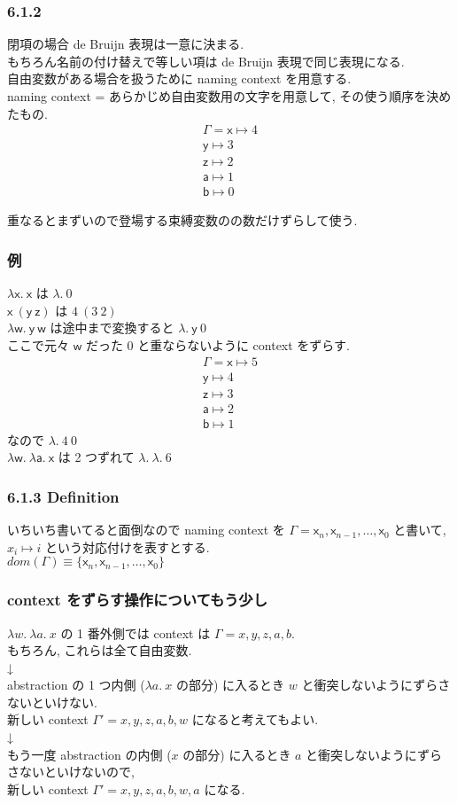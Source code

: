 \documentclass[13pt,dvipdfm]{beamer}
\begin{document}
\frame
{
  \frametitle{6.1.2}
  閉項の場合 de Bruijn 表現は一意に決まる.\\
  もちろん名前の付け替えで等しい項は de Bruijn 表現で同じ表現になる.\\
  自由変数がある場合を扱うために naming context を用意する.\\
  naming context = あらかじめ自由変数用の文字を用意して, その使う順序を決めたもの.\\
  \begin{align*}
    \Gamma = \mathsf{x} \mapsto 4 \\
    \mathsf{y} \mapsto 3 \\
    \mathsf{z} \mapsto 2 \\
    \mathsf{a} \mapsto 1 \\
    \mathsf{b} \mapsto 0
  \end{align*}

  重なるとまずいので登場する束縛変数のの数だけずらして使う.
}

\frame
{
  \frametitle{例}
  $\lambda \mathsf{x}.\ \mathsf{x}$ は $\lambda.\ 0$\\
  $\mathsf{x}\ (\mathsf{y}\ \mathsf{z})$ は $4\ (3\ 2)$\\
  $\lambda \mathsf{w}.\ \mathsf{y}\ \mathsf{w}$ は途中まで変換すると $\lambda.\ \mathsf{y}\ 0$\\
  ここで元々 $\mathsf{w}$ だった 0 と重ならないように context をずらす.
  \begin{align*}
    \Gamma = \mathsf{x} \mapsto 5 \\
    \mathsf{y} \mapsto 4 \\
    \mathsf{z} \mapsto 3 \\
    \mathsf{a} \mapsto 2 \\
    \mathsf{b} \mapsto 1
  \end{align*}
  なので $\lambda.\ 4\ 0$\\
  $\lambda \mathsf{w}.\ \lambda \mathsf{a}.\ \mathsf{x}$ は 2 つずれて $\lambda.\ \lambda.\ 6$
}

\frame
{
  \frametitle{6.1.3 Definition}
  いちいち書いてると面倒なので naming context を
  $\Gamma = \mathsf{x}_n, \mathsf{x}_{n-1},\dots,\mathsf{x}_0$
  と書いて, $x_i \mapsto i$ という対応付けを表すとする.\\
  $dom(\Gamma) \equiv \{\mathsf{x}_n, \mathsf{x}_{n-1},\dots,\mathsf{x}_0\}$
}

\frame
{
  \frametitle{context をずらす操作についてもう少し}
   \label{frame:context_shift}
  $\lambda w.\ \lambda a.\ x$ の 1 番外側では context は $\Gamma = x, y, z, a, b$.\\
  もちろん, これらは全て自由変数.\\
  ↓\\
  abstraction の 1 つ内側 ($\lambda a.\ x$ の部分) に入るとき $w$ と衝突しないようにずらさないといけない.\\
  新しい context $\Gamma' = x, y, z, a, b, w$ になると考えてもよい.\\
  ↓\\
  もう一度 abstraction の内側 ($x$ の部分) に入るとき $a$ と衝突しないようにずらさないといけないので,\\
  新しい context $\Gamma' = x, y, z, a, b, w, a$ になる.
}
\end{document}
